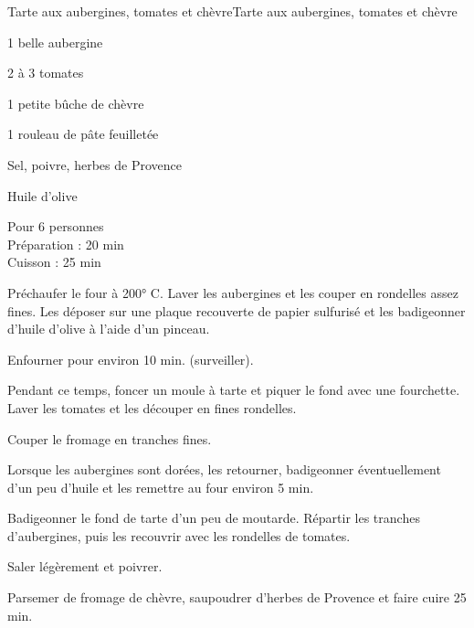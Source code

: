 \begin{recette}{Tarte aux aubergines, tomates et chèvre}{Tarte aux aubergines, tomates et chèvre}

\begin{ingredients}
1 belle aubergine\par
2 à 3 tomates\par
1 petite bûche de chèvre\par
1 rouleau de pâte feuilletée\par
Sel, poivre, herbes de Provence\par
Huile d'olive\par
\end{ingredients}

\begin{infos}
Pour 6 personnes\\
Préparation : 20 min\\
Cuisson : 25 min\\
\end{infos}

\begin{etapes}
\item Préchaufer le four à 200° C. Laver les aubergines et les couper en rondelles assez fines. Les déposer sur une plaque recouverte de papier sulfurisé et les badigeonner d'huile d'olive à l'aide d'un pinceau.
\item Enfourner pour environ 10 min. (surveiller).
\item Pendant ce temps, foncer un moule à tarte et piquer le fond avec une fourchette. Laver les tomates et les découper en fines rondelles.
\item Couper le fromage en tranches fines.
\item Lorsque les aubergines sont dorées, les retourner, badigeonner éventuellement d'un peu d'huile et les remettre au four environ 5 min.
\item Badigeonner le fond de tarte d'un peu de moutarde. Répartir les tranches d'aubergines, puis les recouvrir avec les rondelles de tomates.
\item Saler légèrement et poivrer.
\item Parsemer de fromage de chèvre, saupoudrer d'herbes de Provence et faire cuire 25 min.
\end{etapes}

\end{recette}